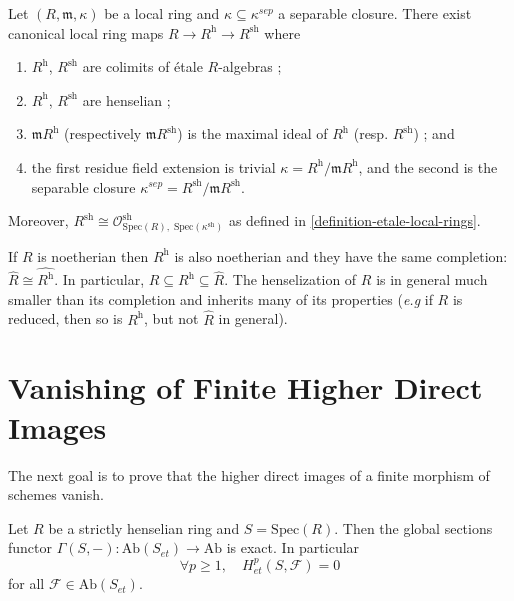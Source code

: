 \begin{theorem}
\label{theorem-henselization}
Let $(R, \mathfrak m, \kappa)$ be a local ring and 
$\kappa\subseteq\kappa^{sep}$ a separable closure. There exist canonical local 
ring maps $ R\to R^\text{h} \to R^\text{sh}$ where
\begin{enumerate}
\item $R^\text{h}$, $R^\text{sh}$ are colimits of \'etale $R$-algebras ;
\item $R^\text{h}$, $R^\text{sh}$ are henselian ;
\item $\mathfrak m R^\text{h}$ (respectively $\mathfrak m R^\text{sh}$) is the 
maximal ideal of $R^\text{h}$ (resp. $R^\text{sh}$) ; and 
\item the first residue field extension is trivial $\kappa=R^\text{h}/\mathfrak 
m R^\text{h}$, and the second is the separable closure $\kappa^{sep} = 
R^\text{sh}/\mathfrak m R^\text{sh}$. 
\end{enumerate} 
Moreover,
$R^\text{sh} \cong \mathcal{O}^\text{sh}_{\text{Spec}(R), \; 
\text{Spec}(\kappa^\text{sh})}$
as defined in \ref{definition-etale-local-rings}.
\end{theorem}

\begin{remark}
\label{remark-henselization-Noetherian}
If $R$ is noetherian then $R^\text{h}$ is also noetherian and they have the 
same completion: $\hat R\cong \widehat{R^\text{h}}$. In particular, $R\subseteq 
R^\text{h} \subseteq \hat R$. The henselization of $R$ is in general much 
smaller than its completion and inherits many of its properties ({\it e.g} if 
$R$ is reduced, then so is $R^\text{h}$, but not $\hat R$ in general).
\end{remark}




\section{Vanishing of Finite Higher Direct Images}
\label{section-vanishing-finite-morphism}

\noindent
The next goal is to prove that the higher direct images of a finite morphism of 
schemes vanish.

\begin{lemma}
\label{lemma-vanishing-etale-cohomology-strictly-henselian}
Let $R$ be a strictly henselian ring and $S=\text{Spec}(R)$. Then the global 
sections functor $\Gamma(S, -): \text{Ab}(S_{et})\to \text{Ab}$ is exact. In 
particular
$$
\forall p\geq 1, \quad H_{et}^p(S, \mathcal{F})=0
$$
for all $\mathcal{F}\in \text{Ab}(S_{et})$. 
\end{lemma}

